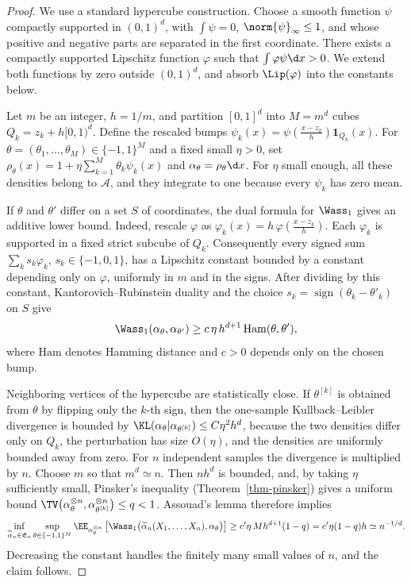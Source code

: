 \begin{proof}
	We use a standard hypercube construction. Choose a smooth function \(\psi\) compactly supported in \((0,1)^d\), with \(\int\psi=0\), \(\norm{\psi}_\infty\leq1\), and whose positive and negative parts are separated in the first coordinate. There exists a compactly supported Lipschitz function \(\varphi\) such that \(\int\varphi\psi\d x>0\). We extend both functions by zero outside \((0,1)^d\), and absorb \(\Lip(\varphi)\) into the constants below.

	Let \(m\) be an integer, \(h=1/m\), and partition \([0,1]^d\) into \(M=m^d\) cubes \(Q_k=z_k+h[0,1)^d\). Define the rescaled bumps
	$\psi_k(x)=\psi\!\left(\frac{x-z_k}{h}\right)\mathbf 1_{Q_k}(x)$.
	For \(\theta=(\theta_1,\ldots,\theta_M)\in\{-1,1\}^M\) and a fixed small \(\eta>0\), set
	$\rho_\theta(x)=1+\eta\sum_{k=1}^M\theta_k\psi_k(x)$ and $\alpha_\theta=\rho_\theta\d x$.
	For \(\eta\) small enough, all these densities belong to \(\mathcal A\), and they integrate to one because every \(\psi_k\) has zero mean.

	If \(\theta\) and \(\theta'\) differ on a set \(S\) of coordinates, the dual formula for \(\Wass_1\) gives an additive lower bound. Indeed, rescale \(\varphi\) as
	\(\varphi_k(x)=h\,\varphi\!\left(\frac{x-z_k}{h}\right)\).
	Each \(\varphi_k\) is supported in a fixed strict subcube of \(Q_k\). Consequently every signed sum \(\sum_k s_k\varphi_k\), \(s_k\in\{-1,0,1\}\), has a Lipschitz constant bounded by a constant depending only on \(\varphi\), uniformly in \(m\) and in the signs. After dividing by this constant, Kantorovich--Rubinstein duality and the choice \(s_k=\operatorname{sign}(\theta_k-\theta'_k)\) on \(S\) give
	\[
		\Wass_1(\alpha_\theta,\alpha_{\theta'})
		\geq
		c\,\eta\,h^{d+1}\,\mathrm{Ham}(\theta,\theta'),
	\]
	where \(\mathrm{Ham}\) denotes Hamming distance and \(c>0\) depends only on the chosen bump.

	Neighboring vertices of the hypercube are statistically close. If \(\theta^{[k]}\) is obtained from \(\theta\) by flipping only the \(k\)-th sign, then the one-sample Kullback--Leibler divergence is bounded by
	$\KL(\alpha_\theta|\alpha_{\theta^{[k]}}) \leq C\eta^2 h^d$,
	because the two densities differ only on \(Q_k\), the perturbation has size \(O(\eta)\), and the densities are uniformly bounded away from zero. For \(n\) independent samples the divergence is multiplied by \(n\). Choose \(m\) so that \(m^d\simeq n\). Then \(n h^d\) is bounded, and, by taking \(\eta\) sufficiently small, Pinsker's inequality (Theorem~\ref{thm-pinsker}) gives a uniform bound
	$\TV\big(\alpha_\theta^{\otimes n},\alpha_{\theta^{[k]}}^{\otimes n}\big) \leq q<1$.
	Assouad's lemma therefore implies
	\[
		\inf_{\widetilde\alpha_n\in\mathfrak E_n}
		\sup_{\theta\in\{-1,1\}^M}
		\EE_{\alpha_\theta^{\otimes n}}
		\left[
			\Wass_1\big(\widetilde\alpha_n(X_1,\ldots,X_n),\alpha_\theta\big)
		\right]
		\geq
		c'\eta\,M h^{d+1}(1-q)
		=
		c'\eta(1-q)h
		\simeq
		n^{-1/d}.
	\]
	Decreasing the constant handles the finitely many small values of \(n\), and the claim follows.
\end{proof}

